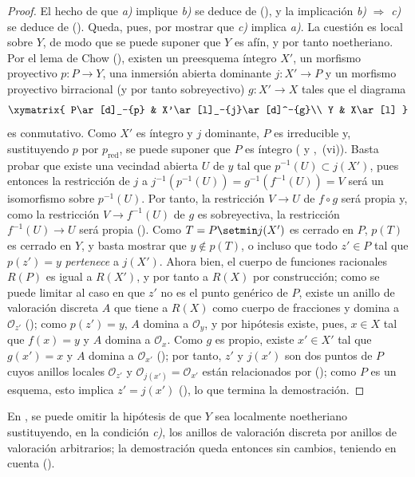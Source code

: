 \begin{proof}
El hecho de que \emph{a)} implique \emph{b)} se deduce de (), y la implicación \emph{b)} $\Rightarrow$ \emph{c)} se deduce de ().
Queda, pues, por mostrar que \emph{c)} implica \emph{a)}.
La cuestión es local sobre $Y$, de modo que se puede suponer que $Y$ es afín, y por tanto noetheriano. Por el lema de Chow (), existen un preesquema íntegro $X'$, un morfismo proyectivo $p:P\to Y$, una inmersión abierta dominante $j:X'\to P$ y un morfismo proyectivo birracional (y por tanto sobreyectivo) $g:X'\to X$ tales que el diagrama
\[
\xymatrix{
P\ar[d]_-{p} & X'\ar[l]_-{j}\ar[d]^-{g}\\
Y & X\ar[l]
}
\]
es conmutativo.
Como $X'$ es íntegro y $j$ dominante, $P$ es irreducible y, sustituyendo $p$ por $p_{\mathrm{red}}$, se puede suponer que $P$ es íntegro ( y ,~(vi)).
Basta probar que existe una vecindad abierta $U$ de $y$ tal que $p^{-1}(U)\subset j(X')$, pues entonces la restricción de $j$ a
$j^{-1}(p^{-1}(U))=g^{-1}(f^{-1}(U))=V$
será un isomorfismo sobre $p^{-1}(U)$. Por tanto, la restricción $V\to U$ de $f\circ g$ será propia y, como la restricción $V\to f^{-1}(U)$ de $g$ es sobreyectiva, la restricción $f^{-1}(U)\to U$ será propia ().
Como $T=P\setmin j(X')$ es cerrado en $P$, $p(T)$ es cerrado en $Y$, y basta mostrar que $y\notin p(T)$, o incluso que todo $z'\in P$ tal que $p(z')=y$ \emph{pertenece} a $j(X')$.
Ahora bien, el cuerpo de funciones racionales $R(P)$ es igual a $R(X')$, y por tanto a $R(X)$ por construcción; como se puede limitar al caso en que $z'$ no es el punto genérico de $P$, existe un anillo de valoración discreta $A$ que tiene a $R(X)$ como cuerpo de fracciones y domina a $\mathcal O_{z'}$ (); como $p(z')=y$, $A$ domina a $\mathcal O_y$, y por hipótesis existe, pues, $x\in X$ tal que $f(x)=y$ y $A$ domina a $\mathcal O_x$.
Como $g$ es propio, existe $x'\in X'$ tal que $g(x')=x$ y $A$ domina a $\mathcal O_{x'}$ (); por tanto, $z'$ y $j(x')$ son dos puntos de $P$ cuyos anillos locales $\mathcal O_{z'}$ y $\mathcal O_{j(x')}=\mathcal O_{x'}$ están relacionados por (); como $P$ es un esquema, esto implica $z'=j(x')$ (), lo que termina la demostración.
\end{proof}

\begin{remark}[15.7.3]
\label{IV.15.7.3}
En , se puede omitir la hipótesis de que $Y$ sea localmente noetheriano sustituyendo, en la condición \emph{c)}, los anillos de valoración discreta por anillos de valoración arbitrarios; la demostración queda entonces sin cambios, teniendo en cuenta ().
\end{remark}

